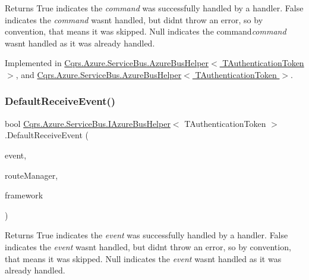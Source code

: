 \begin{DoxyReturn}{Returns}
True indicates the {\itshape command}  was successfully handled by a handler. False indicates the {\itshape command}  wasn\textquotesingle{}t handled, but didn\textquotesingle{}t throw an error, so by convention, that means it was skipped. Null indicates the command{\itshape command}  wasn\textquotesingle{}t handled as it was already handled. 
\end{DoxyReturn}


Implemented in \hyperlink{classCqrs_1_1Azure_1_1ServiceBus_1_1AzureBusHelper_ae35c260f46f8aa7ba928815187b9088e}{Cqrs.\+Azure.\+Service\+Bus.\+Azure\+Bus\+Helper$<$ T\+Authentication\+Token $>$}, and \hyperlink{classCqrs_1_1Azure_1_1ServiceBus_1_1AzureBusHelper_ae35c260f46f8aa7ba928815187b9088e}{Cqrs.\+Azure.\+Service\+Bus.\+Azure\+Bus\+Helper$<$ T\+Authentication\+Token $>$}.

\mbox{\label{interfaceCqrs_1_1Azure_1_1ServiceBus_1_1IAzureBusHelper_a29758e82b2fd6c7e3ed6b19547887db9}} 
\subsubsection{\texorpdfstring{Default\+Receive\+Event()}{DefaultReceiveEvent()}}
{\footnotesize\ttfamily bool \hyperlink{interfaceCqrs_1_1Azure_1_1ServiceBus_1_1IAzureBusHelper}{Cqrs.\+Azure.\+Service\+Bus.\+I\+Azure\+Bus\+Helper}$<$ T\+Authentication\+Token $>$.Default\+Receive\+Event (\begin{DoxyParamCaption}\item[{\hyperlink{interfaceCqrs_1_1Events_1_1IEvent}{I\+Event}$<$ T\+Authentication\+Token $>$ @}]{event,  }\item[{\hyperlink{classCqrs_1_1Bus_1_1RouteManager}{Route\+Manager}}]{route\+Manager,  }\item[{string}]{framework }\end{DoxyParamCaption})}

\begin{DoxyReturn}{Returns}
True indicates the {\itshape event}  was successfully handled by a handler. False indicates the {\itshape event}  wasn\textquotesingle{}t handled, but didn\textquotesingle{}t throw an error, so by convention, that means it was skipped. Null indicates the {\itshape event}  wasn\textquotesingle{}t handled as it was already handled. 
\end{DoxyReturn}



